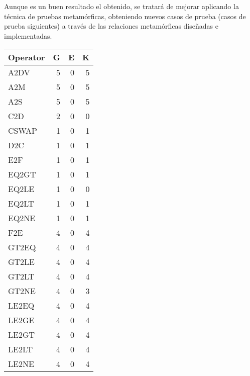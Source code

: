 Aunque es un buen resultado el obtenido, se tratará de mejorar aplicando la técnica de pruebas metamórficas, obteniendo nuevos casos de prueba (casos de prueba siguientes) a través de las relaciones metamórficas diseñadas e implementadas.
%
\begin{table}
    \centering
    \begin{tabular}{lrrr}
    \toprule
    \textbf{Operator} & \textbf{G} & \textbf{E} & \textbf{K} \\
    \midrule
A2DV    &       5       &       0       &       5       \\
A2M         &   5       &       0       &       5       \\
A2S         &   5       &       0       &       5       \\
C2D         &   2       &       0       &       0       \\
CSWAP   &       1       &       0       &       1       \\
D2C         &   1       &       0       &       1       \\
E2F         &   1       &       0       &       1       \\
EQ2GT   &       1       &       0       &       1       \\
EQ2LE   &       1       &       0       &       0       \\
EQ2LT   &       1       &       0       &       1       \\
EQ2NE   &       1       &       0       &       1       \\
F2E      &      4       &       0       &       4       \\
GT2EQ   &       4       &       0       &       4       \\
GT2LE   &       4       &       0       &       4       \\
GT2LT   &       4       &       0       &       4       \\
GT2NE   &       4       &       0       &       3       \\
LE2EQ   &       4       &       0       &       4       \\
LE2GE   &       4       &       0       &       4       \\
LE2GT   &       4       &       0       &       4       \\
LE2LT   &       4       &       0       &       4       \\
LE2NE   &       4       &       0       &       4       \\

\end{tabular}
\end{table}
